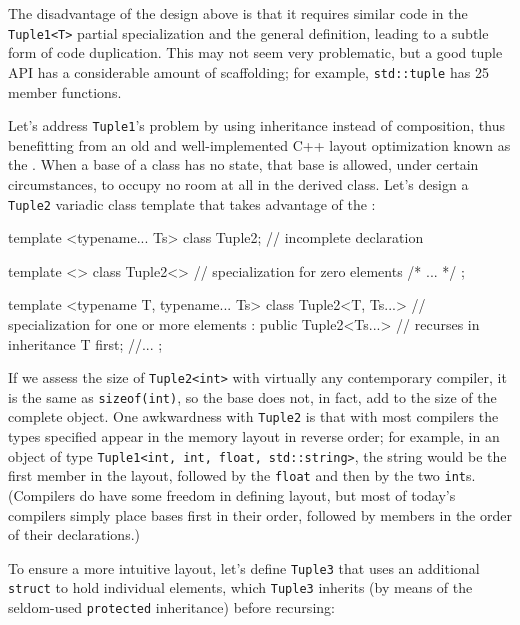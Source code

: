 The disadvantage of the design above is that it requires similar code in
the \lstinline!Tuple1<T>! partial specialization and the general
definition, leading to a subtle form of code duplication. This may not
seem very problematic, but a good tuple API has a considerable amount of
scaffolding; for example, \lstinline!std::tuple! has 25 member functions.

Let's address \lstinline!Tuple1!'s problem by using inheritance instead of
composition, thus benefitting from an old and well-implemented C++
layout optimization known as the . When
a base of a class has no state, that base is allowed, under certain
circumstances, to occupy no room at all in the derived class. Let's
design a \lstinline!Tuple2! variadic class template that takes advantage of
the :

\begin{emcppslisting}
template <typename... Ts>
class Tuple2;                // incomplete declaration

template <>
class Tuple2<>               // specialization for zero elements
{ /* ... */ };

template <typename T, typename... Ts>
class Tuple2<T, Ts...>       // specialization for one or more elements
    : public Tuple2<Ts...>   // recurses in inheritance
{
    T first;
    //...
};
\end{emcppslisting}
    

\noindent If we assess the size of \lstinline!Tuple2<int>! with virtually any
contemporary compiler, it is the same as \lstinline!sizeof(int)!, so the
base does not, in fact, add to the size of the complete object. One
awkwardness with \lstinline!Tuple2! is that with most compilers the types
specified appear in the memory layout in reverse order; for example, in
an object of type\linebreak%
\lstinline!Tuple1<int,!~\lstinline!int,!~\lstinline!float,!~\lstinline!std::string>!,
the string would be the first member in the layout, followed by the
\lstinline!float! and then by the two \lstinline!int!s. (Compilers do have
some freedom in defining layout, but most of today's compilers simply
place bases first in their order, followed by members in the order of
their declarations.)

To ensure a more intuitive layout, let's define \lstinline!Tuple3! that
uses an additional \lstinline!struct! to hold individual elements, which
\lstinline!Tuple3! inherits (by means of the seldom-used \lstinline!protected!
inheritance) before recursing:

